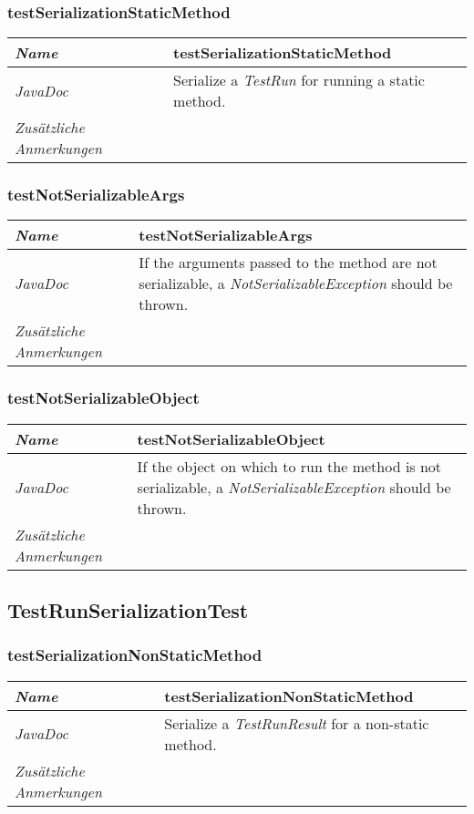 \documentclass[a4paper]{report}
\begin{document}
\subsubsection{testSerializationStaticMethod}
\begin{tabular}{p{2.3cm}  p{11.5cm}}
  \hline
 \textit{Name} & testSerializationStaticMethod\\
  \hline
 \textit{JavaDoc} & Serialize a \emph{TestRun} for running a static method. \\
  \hline
 \textit{Zusätzliche Anmerkungen} & \\
  \hline
\end{tabular}

\subsubsection{testNotSerializableArgs}
\begin{tabular}{p{2.3cm}  p{11.5cm}}
  \hline
 \textit{Name} & testNotSerializableArgs\\
  \hline
 \textit{JavaDoc} & If the arguments passed to the method are not serializable, a \emph{NotSerializableException} should be thrown. \\
  \hline
 \textit{Zusätzliche Anmerkungen} & \\
  \hline
\end{tabular}

\subsubsection{testNotSerializableObject}
\begin{tabular}{p{2.3cm}  p{11.5cm}}
  \hline
 \textit{Name} & testNotSerializableObject\\
  \hline
 \textit{JavaDoc} & If the object on which to run the method is not serializable, a \emph{NotSerializableException} should be thrown. \\
  \hline
 \textit{Zusätzliche Anmerkungen} & \\
  \hline
\end{tabular}

\subsection{TestRunSerializationTest}

\subsubsection{testSerializationNonStaticMethod}
\begin{tabular}{p{2.3cm}  p{11.5cm}}
  \hline
 \textit{Name} & testSerializationNonStaticMethod\\
  \hline
 \textit{JavaDoc} & Serialize a \emph{TestRunResult} for a non-static method. \\
  \hline
 \textit{Zusätzliche Anmerkungen} & \\
  \hline
\end{tabular}
\end{document}
